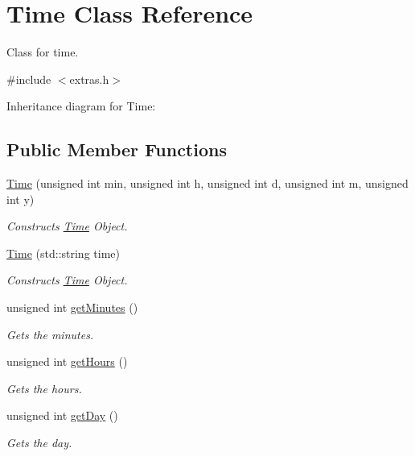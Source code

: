 \hypertarget{classTime}{}\section{Time Class Reference}
\label{classTime}


Class for time.  




{\ttfamily \#include $<$extras.\+h$>$}



Inheritance diagram for Time\+:
\subsection*{Public Member Functions}
\begin{DoxyCompactItemize}
\item 
\hyperlink{classTime_a355bb7292c28e01866289e1119f457a9}{Time} (unsigned int min, unsigned int h, unsigned int d, unsigned int m, unsigned int y)
\begin{DoxyCompactList}\small\item\em Constructs \hyperlink{classTime}{Time} Object. \end{DoxyCompactList}\item 
\hyperlink{classTime_a15f171401599a9a058e89e6cf3244f2b}{Time} (std\+::string time)
\begin{DoxyCompactList}\small\item\em Constructs \hyperlink{classTime}{Time} Object. \end{DoxyCompactList}\item 
unsigned int \hyperlink{classTime_a800d91da444cd295a329925c45942359}{get\+Minutes} ()
\begin{DoxyCompactList}\small\item\em Gets the minutes. \end{DoxyCompactList}\item 
unsigned int \hyperlink{classTime_ac38ba7bbc9876d7d75c6fb16ba7ac453}{get\+Hours} ()
\begin{DoxyCompactList}\small\item\em Gets the hours. \end{DoxyCompactList}\item 
unsigned int \hyperlink{classTime_abdccc37217b520155a67a1d732014f1a}{get\+Day} ()
\begin{DoxyCompactList}\small\item\em Gets the day. \end{DoxyCompactList}\item 

\end{DoxyCompactItemize}
